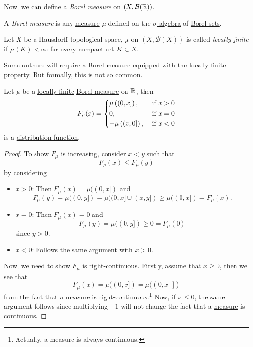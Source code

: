 Now, we can define a \emph{Borel measure} on \((X, \mathcal{\MakeUppercase{B}} (\mathbb{\MakeUppercase{r}} ))\).
\begin{definition}\label{def:Borel-measure}
	A \emph{Borel measure} is any \hyperref[def:measure]{measure} \(\mu\) defined on the \hyperref[def:sigma-algebra]{\(\sigma\)-algebra} of \hyperref[def:Borel-set]{Borel sets}.
\end{definition}

\begin{definition}\label{def:locally-finite}
	Let \(X\) be a Hausdorff topological space, \(\mu\) on \((X, \mathcal{B} (X))\) is called \emph{locally finite} if \(\mu (K)<\infty \)
	for every compact set \(K\subset X\).
\end{definition}

\begin{note}
	Some authors will require a \hyperref[def:Borel-measure]{Borel measure} equipped with the \hyperref[def:locally-finite]{locally finite} property.
	But formally, this is not so common.
\end{note}

\begin{lemma}
	Let \(\mu \) be a \hyperref[def:locally-finite]{locally finite} \hyperref[def:Borel-measure]{Borel measure} on
	\(\mathbb{\MakeUppercase{R}} \), then
	\[
		F_{\mu }(x) = \begin{dcases}
			\mu \left((0, x]\right),  & \text{ if } x > 0 \\
			0,                        & \text{ if } x = 0 \\
			-\mu \left((x, 0]\right), & \text{ if } x < 0
		\end{dcases}
	\]
	is a \hyperref[def:distribution-function]{distribution function}.
\end{lemma}
\begin{proof}
	To show \(F_\mu\) is increasing, consider \(x<y\) such that
	\[
		F_\mu (x) \leq F_\mu (y)
	\]
	by considering
	\begin{itemize}
		\item \(x>0\): Then \(F_\mu (x) = \mu ((0, x])\) and
		      \[
			      F_\mu (y) = \mu ((0, y]) = \mu ((0, x]\cup (x, y]) \geq \mu ((0, x]) = F_\mu (x).
		      \]
		\item \(x=0\): Then \(F_\mu (x) = 0\) and
		      \[
			      F_\mu (y) = \mu ((0, y])\geq 0 = F_\mu (0)
		      \]
		      since \(y>0\).
		\item \(x<0\): Follows the same argument with \(x>0\).
	\end{itemize}

	\par Now, we need to show \(F_\mu \) is right-continuous. Firstly, assume that \(x \geq 0\), then we see that
	\[
		F_\mu(x) = \mu ((0, x]) = \mu ((0, x^+])
	\]
	from the fact that a measure is right-continuous.\footnote{Actually, a measure is always continuous.} Now, if \(x\leq 0\),
	the same argument follows since multiplying \(-1\) will not change the fact that a \hyperref[def:measure]{measure} is continuous.
\end{proof}


